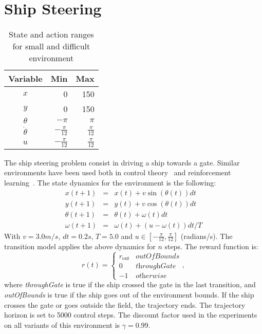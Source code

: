 \section{Ship Steering}
\label{a:ship_steering_description}
\begin{table}[b]
  \centering
  \begin{tabular}{c r r}
     \toprule
     Variable & Min & Max \\
     \midrule
     $x$ & 0 & 150 \\ 
     $y$ & 0 & 150 \\
     $\theta$ & $-\pi$ & $\pi$ \\
     $\dot{\theta}$ & $-\frac{\pi}{12}$ & $\frac{\pi}{12}$ \\
     $u$ & $-\frac{\pi}{12}$ & $\frac{\pi}{12}$ \\
     \bottomrule
  \end{tabular}
  \caption{State and action ranges for small and difficult environment}
  \label{tab:ship_steering_small_ranges}
\end{table}

The ship steering problem consist in driving a ship towards a gate. Similar environments have been used both in control theory~\cite{Anderson1990} and reinforcement learning~\cite{ghavamzadeh2003hier}. The state dynamics for the environment is the following:
\begin{eqnarray*}
x(t+1) & = & x(t) + v\sin(\theta(t))dt \\
y(t+1) & = & y(t) + v\cos(\theta(t))dt \\
\theta(t+1) & = & \theta(t) + \omega(t)dt \\
\omega(t+1) & = & \omega(t) + (u - \omega(t))dt/T
\end{eqnarray*}
With $v = 3.0m/s$, $dt = 0.2s$, $T = 5.0$ and $u\in[-\frac{\pi}{12}, \frac{\pi}{12}]$ (radians/s).
The transition model applies the above dynamics for $n$ steps. The reward function is:
\begin{equation*}
r(t)=\begin{cases}
r_{\text{out}} & \textit{outOfBounds}\\
0 & \textit{throughGate}\\
-1 & \textit{otherwise}
\end{cases},
\end{equation*}
where \textit{throughGate} is true if the ship crossed the gate in the last transition, and \textit{outOfBounds} is true if the ship goes out of the environment bounds.
If the ship crosses the gate or goes outside the field, the trajectory ends. The trajectory horizon is set to 5000 control steps. The discount factor used in the experiments on all variants of this environment is $\gamma = 0.99$.

